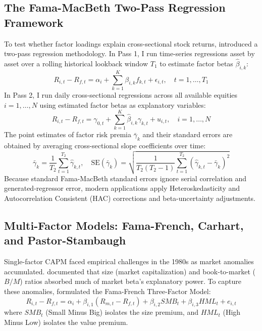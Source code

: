 \subsection{The Fama-MacBeth Two-Pass Regression Framework}
To test whether factor loadings explain cross-sectional stock returns, \citet{fama1973risk} introduced a two-pass regression methodology. In Pass 1, I run time-series regressions asset by asset over a rolling historical lookback window $T_1$ to estimate factor betas $\hat{\beta}_{i,k}$:
\begin{equation}
R_{i,t} - R_{f,t} = \alpha_i + \sum_{k=1}^{K} \beta_{i,k} f_{k,t} + \epsilon_{i,t}, \quad t = 1, \dots, T_1
\label{eq:ch2_fm_first_pass}
\end{equation}
In Pass 2, I run daily cross-sectional regressions across all available equities $i=1,\dots,N$ using estimated factor betas as explanatory variables:
\begin{equation}
R_{i,t} - R_{f,t} = \gamma_{0,t} + \sum_{k=1}^{K} \hat{\beta}_{i,k} \gamma_{k,t} + u_{i,t}, \quad i = 1, \dots, N
\label{eq:ch2_fm_second_pass}
\end{equation}
The point estimates of factor risk premia $\bar{\gamma}_k$ and their standard errors are obtained by averaging cross-sectional slope coefficients over time:
\begin{equation}
\bar{\gamma}_k = \frac{1}{T_2} \sum_{t=1}^{T_2} \hat{\gamma}_{k,t}, \quad \text{SE}(\bar{\gamma}_k) = \sqrt{\frac{1}{T_2(T_2-1)} \sum_{t=1}^{T_2} \left( \hat{\gamma}_{k,t} - \bar{\gamma}_k \right)^2}
\label{eq:ch2_fm_se}
\end{equation}
Because standard Fama-MacBeth standard errors ignore serial correlation and generated-regressor error, modern applications apply Heteroskedasticity and Autocorrelation Consistent (HAC) corrections \citep{newey1987simple} and \citet{shanken1992on} beta-uncertainty adjustments.

\subsection{Multi-Factor Models: Fama-French, Carhart, and Pastor-Stambaugh}
Single-factor CAPM faced empirical challenges in the 1980s as market anomalies accumulated. \citet{fama1992cross} documented that size (market capitalization) and book-to-market ($B/M$) ratios absorbed much of market beta's explanatory power. To capture these anomalies, \citet{fama1993common} formulated the Fama-French Three-Factor Model:
\begin{equation}
R_{i,t} - R_{f,t} = \alpha_i + \beta_{i,1} (R_{m,t} - R_{f,t}) + \beta_{i,2} SMB_t + \beta_{i,3} HML_t + e_{i,t}
\label{eq:ch2_ff3}
\end{equation}
where $SMB_t$ (Small Minus Big) isolates the size premium, and $HML_t$ (High Minus Low) isolates the value premium.

